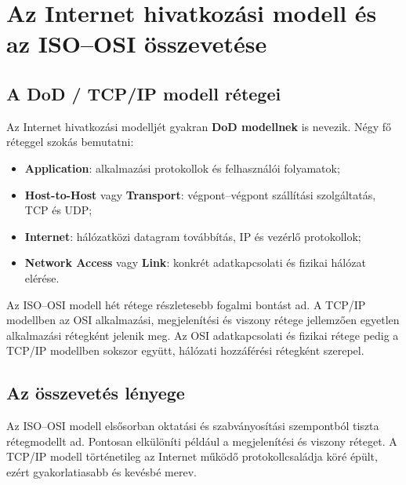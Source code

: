 

\section{Az Internet hivatkozási modell és az ISO--OSI összevetése}

\subsection{A DoD / TCP/IP modell rétegei}

Az Internet hivatkozási modelljét gyakran \textbf{DoD modellnek} is nevezik. Négy fő réteggel szokás bemutatni:

\begin{itemize}
  \item \textbf{Application}: alkalmazási protokollok és felhasználói folyamatok;
  \item \textbf{Host-to-Host} vagy \textbf{Transport}: végpont--végpont szállítási szolgáltatás, TCP és UDP;
  \item \textbf{Internet}: hálózatközi datagram továbbítás, IP és vezérlő protokollok;
  \item \textbf{Network Access} vagy \textbf{Link}: konkrét adatkapcsolati és fizikai hálózat elérése.
\end{itemize}

Az ISO--OSI modell hét rétege részletesebb fogalmi bontást ad. A TCP/IP modellben az OSI alkalmazási, megjelenítési és viszony rétege jellemzően egyetlen alkalmazási rétegként jelenik meg. Az OSI adatkapcsolati és fizikai rétege pedig a TCP/IP modellben sokszor együtt, hálózati hozzáférési rétegként szerepel.



\begin{center}

\end{center}

\subsection{Az összevetés lényege}

Az ISO--OSI modell elsősorban oktatási és szabványosítási szempontból tiszta rétegmodellt ad. Pontosan elkülöníti például a megjelenítési és viszony réteget. A TCP/IP modell történetileg az Internet működő protokollcsaládja köré épült, ezért gyakorlatiasabb és kevésbé merev.

